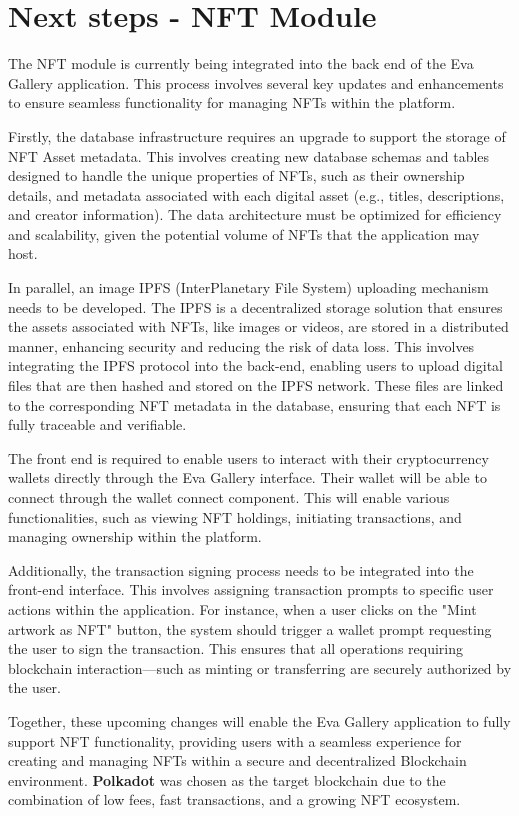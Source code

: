 \section{Next steps - NFT Module}
The NFT module is currently being integrated into the back end of the Eva Gallery application. This process involves several key updates and enhancements to ensure seamless functionality for managing NFTs within the platform.

Firstly, the database infrastructure requires an upgrade to support the storage of NFT Asset metadata. This involves creating new database schemas and tables designed to handle the unique properties of NFTs, such as their ownership details, and metadata associated with each digital asset (e.g., titles, descriptions, and creator information). The data architecture must be optimized for efficiency and scalability, given the potential volume of NFTs that the application may host.

In parallel, an image IPFS (InterPlanetary File System) uploading mechanism needs to be developed. The IPFS is a decentralized storage solution that ensures the assets associated with NFTs, like images or videos, are stored in a distributed manner, enhancing security and reducing the risk of data loss. This involves integrating the IPFS protocol into the back-end, enabling users to upload digital files that are then hashed and stored on the IPFS network. These files are linked to the corresponding NFT metadata in the database, ensuring that each NFT is fully traceable and verifiable.

The front end is required to enable users to interact with their cryptocurrency wallets directly through the Eva Gallery interface. Their wallet will be able to connect through the wallet connect component. This will enable various functionalities, such as viewing NFT holdings, initiating transactions, and managing ownership within the platform.

Additionally, the transaction signing process needs to be integrated into the front-end interface. This involves assigning transaction prompts to specific user actions within the application. For instance, when a user clicks on the "Mint artwork as NFT" button, the system should trigger a wallet prompt requesting the user to sign the transaction. This ensures that all operations requiring blockchain interaction—such as minting or transferring are securely authorized by the user.

Together, these upcoming changes will enable the Eva Gallery application to fully support NFT functionality, providing users with a seamless experience for creating and managing NFTs within a secure and decentralized Blockchain environment.
\textbf{Polkadot} was chosen as the target blockchain due to the combination of low fees, fast transactions, and a growing NFT ecosystem. 

